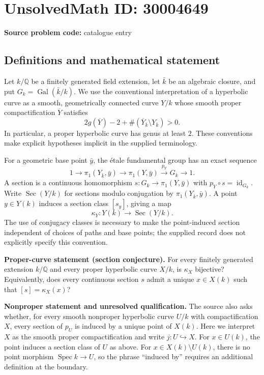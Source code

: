 \documentclass[11pt]{article}
\newcommand{\Q}{\mathbb{Q}}
\begin{document}
\section*{UnsolvedMath ID: 30004649}
\textbf{Source problem code:} catalogue entry
\subsection{Definitions and mathematical statement}
Let \(k/\Q\) be a finitely generated field extension, let \(\bar k\) be an algebraic closure, and put \(G_k=\operatorname{Gal}(\bar k/k)\). We use the conventional interpretation of a hyperbolic curve as a smooth, geometrically connected curve \(Y/k\) whose smooth proper compactification \(\overline Y\) satisfies
\[
2g(\overline Y)-2+\#(\overline Y_{\bar k}\setminus Y_{\bar k})>0.
\]
In particular, a proper hyperbolic curve has genus at least \(2\). These conventions make explicit hypotheses implicit in the supplied terminology.

For a geometric base point \(\bar y\), the étale fundamental group has an exact sequence
\[
1\longrightarrow\pi_1(Y_{\bar k},\bar y)\longrightarrow\pi_1(Y,\bar y)\xrightarrow{p_Y}G_k\longrightarrow1.
\]
A section is a continuous homomorphism \(s:G_k\to\pi_1(Y,\bar y)\) with \(p_Y\circ s=\operatorname{id}_{G_k}\). Write \(\operatorname{Sec}(Y/k)\) for sections modulo conjugation by \(\pi_1(Y_{\bar k},\bar y)\). A point \(y\in Y(k)\) induces a section class \([s_y]\), giving a map
\[
\kappa_Y:Y(k)\longrightarrow\operatorname{Sec}(Y/k).
\]
The use of conjugacy classes is necessary to make the point-induced section independent of choices of paths and base points; the supplied record does not explicitly specify this convention.

\textbf{Proper-curve statement (section conjecture).} For every finitely generated extension \(k/\Q\) and every proper hyperbolic curve \(X/k\), is \(\kappa_X\) bijective? Equivalently, does every continuous section \(s\) admit a unique \(x\in X(k)\) such that \([s]=\kappa_X(x)\)?

\textbf{Nonproper statement and unresolved qualification.} The source also asks whether, for every smooth nonproper hyperbolic curve \(U/k\) with compactification \(X\), every section of \(p_U\) is induced by a unique point of \(X(k)\). Here we interpret \(X\) as the smooth proper compactification and write \(j:U\hookrightarrow X\). For \(x\in U(k)\), the point induces a section class of \(U\) as above. For \(x\in X(k)\setminus U(k)\), there is no point morphism \(\operatorname{Spec}k\to U\), so the phrase ``induced by'' requires an additional definition at the boundary.
\end{document}
